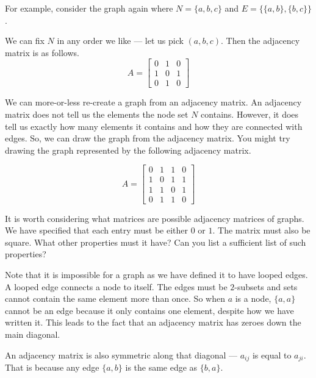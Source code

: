 \documentclass{iansnotes}
\begin{document}
  For example, consider the graph again where $N = \{a, b, c\}$ and $E = \{ \{a, b\}, \{b, c\} \}$.
  \begin{center}
  \end{center}
  We can fix $N$ in any order we like --- let us pick $(a,b,c)$.
  Then the adjacency matrix is as follows.
  \[ A = \begin{bmatrix} 0 & 1 & 0 \\ 1 & 0 & 1 \\ 0 & 1 & 0 \end{bmatrix} \]
  
  We can more-or-less re-create a graph from an adjacency matrix.
  An adjacency matrix does not tell us the elements the node set $N$ contains.
  However, it does tell us exactly how many elements it contains and how they are connected with edges.
  So, we can draw the graph from the adjacency matrix.
  You might try drawing the graph represented by the following adjacency matrix.

  \[ A = \begin{bmatrix} 0 & 1 & 1 & 0 \\ 1 & 0 & 1 & 1 \\ 1 & 1 & 0 & 1 \\ 0 & 1 & 1 & 0 \end{bmatrix} \]

  It is worth considering what matrices are possible adjacency matrices of graphs.
  We have specified that each entry must be either $0$ or $1$.
  The matrix must also be square.
  What other properties must it have?
  Can you list a sufficient list of such properties?

  Note that it is impossible for a graph as we have defined it to have looped edges.
  A looped edge connects a node to itself.
  The edges must be $2$-subsets and sets cannot contain the same element more than once.
  So when $a$ is a node, $\{ a, a \}$ cannot be an edge because it only contains one element, despite how we have written it.
  This leads to the fact that an adjacency matrix has zeroes down the main diagonal.
    
  An adjacency matrix is also symmetric along that diagonal --- $a_{ij}$ is equal to $a_{ji}$.
  That is because any edge $\{ a, b \}$ is the same edge as $\{ b, a \}$.
\end{document}
